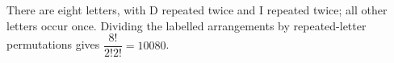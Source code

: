 There are eight letters, with D repeated twice and I repeated twice; all other letters occur once. Dividing the labelled arrangements by repeated-letter permutations gives $\boxed{\dfrac{8!}{2!2!}=10080}$.
